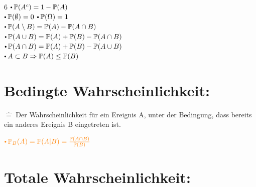 \documentclass[8pt,a4paper,landscape]{extarticle}
\begin{document}
\begin{multicols*}{6}
    $\sbullet \mathbb{P}(A^c) = 1 - \mathbb{P}(A) $ \\
    $\sbullet \mathbb{P}(\emptyset) = 0 $ \hspace{3pt} $\sbullet \mathbb{P}(\Omega) = 1 $ \\
    $\sbullet \mathbb{P}(A \setminus B) = \mathbb{P}(A) - \mathbb{P}(A \cap B) $ \\
    $\sbullet \mathbb{P}(A \cup B) = \mathbb{P}(A) + \mathbb{P}(B) - \mathbb{P}(A \cap B) $ \\
    $\sbullet \mathbb{P}(A \cap B) = \mathbb{P}(A) + \mathbb{P}(B) - \mathbb{P}(A \cup B) $ \\
    $\sbullet A \subset B \Rightarrow \mathbb{P}(A) \leq \mathbb{P}(B) $

\section{Bedingte Wahrscheinlichkeit:}

$\hat{=}$ Der Wahrscheinlichkeit für ein Ereignis A, unter der Bedingung, 
dass bereits ein anderes Ereignis B eingetreten ist. \\
\par\vspace*{-3pt}
$\color{orange}\sbullet \mathbb{P}_B(A) = \mathbb{P}(A | B) = \frac{\mathbb{P}(A \cap B)}{\mathbb{P}(B)}$
\vspace{3pt}
%

    \vspace{-1pt}
    \vspace{-2pt}
    \vspace{0pt}

\section{Totale Wahrscheinlichkeit:}


\end{multicols*}
\end{document}
